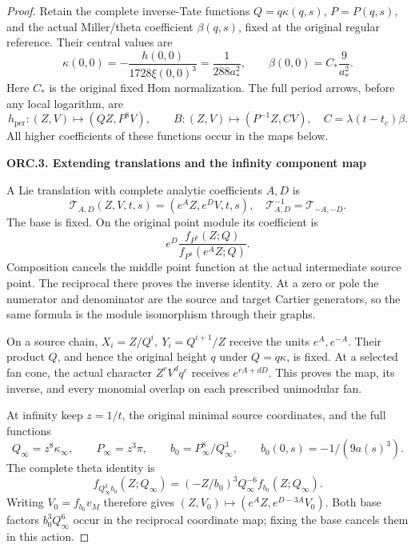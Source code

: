 \begin{proof}
Retain the complete inverse-Tate functions \(Q=q\kappa(q,s)\),
\(P=P(q,s)\), and the actual Miller/theta coefficient \(\beta(q,s)\),
fixed at the original regular reference. Their central values are
\[
\kappa(0,0)=-\frac{h(0,0)}{1728\xi(0,0)^3}
 =\frac1{288a_*^2},\qquad
\beta(0,0)=C_*\frac9{a_*^2}.
\tag{ORC.12}
\]
Here \(C_*\) is the original fixed Hom normalization. The full
period arrows, before any local logarithm, are
\[
h_{\mathrm{per}}:(Z,V)\longmapsto(QZ,P^8V),\qquad
B:(Z,V)\longmapsto(P^{-1}Z,CV),\quad
C=\lambda(t-t_c)\beta .
\tag{ORC.13}
\]
All higher coefficients of these functions occur in the maps below.

\par

\medskip\noindent\textbf{ORC.3. Extending translations and the infinity component map}

\par\nobreak

A Lie translation with complete analytic coefficients \(A,D\) is
\[
\mathcal T_{A,D}(Z,V,t,s)=(e^AZ,e^DV,t,s),
\quad
\mathcal T_{A,D}^{-1}=\mathcal T_{-A,-D}.
\tag{ORC.14}
\]
The base is fixed. On the original point module its coefficient is
\[
e^D\frac{f_{P^8}(Z;Q)}{f_{P^8}(e^AZ;Q)}.
\tag{ORC.15}
\]
Composition cancels the middle point function at the actual
intermediate source point. The reciprocal there proves the
inverse identity. At a zero or pole the numerator and denominator
are the source and target Cartier generators, so the same formula
is the module isomorphism through their graphs.

On a source chain, \(X_i=Z/Q^i,\ Y_i=Q^{i+1}/Z\) receive the
units \(e^A,e^{-A}\). Their product \(Q\), and hence the original
height \(q\) under \(Q=q\kappa\), is fixed. At a selected fan cone,
the actual character \(Z^rV^d q^e\) receives \(e^{rA+dD}\).
This proves the map, its inverse, and every monomial overlap on
each prescribed unimodular fan.

At infinity keep \(z=1/t\), the original minimal source coordinates,
and the full functions
\[
Q_\infty=z^8\kappa_\infty,\qquad
P_\infty=z^3\pi,\qquad
b_0=P_\infty^8/Q_\infty^3,\qquad
b_0(0,s)=-1/(9a(s)^3).
\tag{ORC.16}
\]
The complete theta identity is
\[
f_{Q_\infty^3b_0}(Z;Q_\infty)
 =(-Z/b_0)^3Q_\infty^{-6}f_{b_0}(Z;Q_\infty).
\tag{ORC.17}
\]
Writing \(V_0=f_{b_0}v_M\) therefore gives
\((Z,V_0)\mapsto(e^AZ,e^{D-3A}V_0)\).
Both base factors \(b_0^3Q_\infty^6\) occur in the reciprocal
coordinate map; fixing the base cancels them in this action.


\end{proof}
